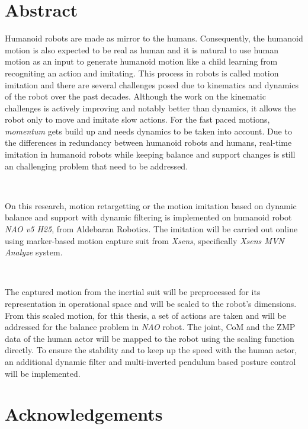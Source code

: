 \documentclass{thesisreport}
\begin{document}
   
 
  \section*{Abstract}
   
  Humanoid robots are made as mirror to the humans. Consequently, the humanoid motion is also expected to be real as 
  human and it is natural to use human motion as an input to generate humanoid motion like a child learning from recogniting
  an action and imitating. This process in robots is called motion imitation and there are several challenges posed 
  due to kinematics and dynamics of the robot over the past decades. Although the work on the kinematic challenges is 
  actively improving and notably better than dynamics, it allows the robot only to move and imitate slow actions. 
  For the fast paced motions, \textit{momentum} gets build up and needs dynamics to be taken into account. Due to the 
  differences in redundancy between humanoid robots and humans, real-time imitation in humanoid robots while keeping 
  balance and support changes is still an challenging problem that need to be addressed.

  ~
  
  On this research, motion retargetting or the motion imitation based on dynamic balance and support with dynamic filtering 
  is implemented on humanoid robot \textit{NAO v5 H25}, from Aldebaran Robotics. The imitation will be carried out 
  online using marker-based motion capture suit from \textit{Xsens}, specifically \textit{Xsens MVN Analyze} system.
  
  ~
  
  The captured motion from the inertial suit will be preprocessed for its representation in operational space and will be 
  scaled to the robot's dimensions. From this scaled motion, for this thesis, a set of actions are taken and will be addressed
  for the balance problem in \textit{NAO} robot. The joint, CoM and the ZMP data of the human actor will be mapped to the robot
  using the scaling function directly. To ensure the stability and to keep up the speed with the human actor, an additional 
  dynamic filter and multi-inverted pendulum based posture control will be implemented. 
 
 \newpage
 
 \section*{Acknowledgements}
 
\end{document}
